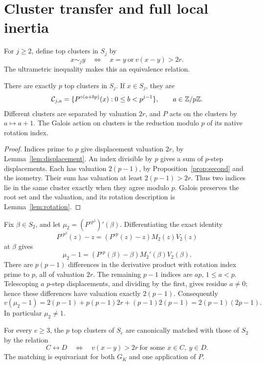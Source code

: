 \section{Cluster transfer and full local inertia}\label{sec:inertia}

For \(j\ge2\), define top clusters in \(S_j\) by
\[
 x\sim_j y \quad\Longleftrightarrow\quad
 x=y\ \text{or}\ v(x-y)>2r .
\]
The ultrametric inequality makes this an equivalence relation.

\begin{lemma}\label{lem:clusters}
There are exactly \(p\) top clusters in \(S_j\). If \(x\in S_j\),
they are
\[
 \mathcal C_{j,a}
 =\{P^{\circ(a+bp)}(x):0\le b<p^{j-1}\},
 \qquad a\in\mathbb Z/p\mathbb Z.
\]
Different clusters are separated by valuation \(2r\), and \(P\)
acts on the clusters by \(a\mapsto a+1\). The Galois action on
clusters is the reduction modulo \(p\) of its native rotation index.
\end{lemma}

\begin{proof}
Indices prime to \(p\) give displacement valuation \(2r\), by
Lemma~\ref{lem:displacement}. An index divisible by \(p\)
gives a sum of \(p\)-step displacements. Each has valuation
\(2(p-1)\), by Proposition~\ref{prop:second} and the isometry.
Their sum has valuation at least \(2(p-1)>2r\).
Thus two indices lie in the same cluster exactly when they agree
modulo \(p\). Galois preserves the root set and the valuation,
and its rotation description is Lemma~\ref{lem:rotation}.
\end{proof}

Fix \(\beta\in S_2\), and let
\(\mu_2=(P^{\circ p^2})'(\beta)\). Differentiating the exact identity
\[
 P^{\circ p^2}(z)-z
 =(P^{\circ p}(z)-z)M_2(z)V_2(z)
\]
at \(\beta\) gives
\[
 \mu_2-1=(P^{\circ p}(\beta)-\beta)M_2'(\beta)V_2(\beta).
\]
There are \(p(p-1)\) differences in the derivative product
with rotation index prime to \(p\), all of valuation \(2r\).
The remaining \(p-1\) indices are \(ap\), \(1\le a<p\).
Telescoping \(a\) \(p\)-step displacements, and dividing by
the first, gives residue \(a\ne0\); hence these differences
have valuation exactly \(2(p-1)\). Consequently
\begin{equation}\label{eq:second-multiplier}
 v(\mu_2-1)
 =2(p-1)+p(p-1)2r+(p-1)2(p-1)
 =2(p-1)(2p-1).
\end{equation}
In particular \(\mu_2\ne1\).

\begin{lemma}\label{lem:matching}
For every \(e\ge3\), the \(p\) top clusters of \(S_e\) are
canonically matched with those of \(S_2\) by the relation
\[
 C\longleftrightarrow D
 \quad\Longleftrightarrow\quad
 v(x-y)>2r\ \text{for some }x\in C,\ y\in D.
\]
The matching is equivariant for both \(G_K\) and one application of \(P\).
\end{lemma}


